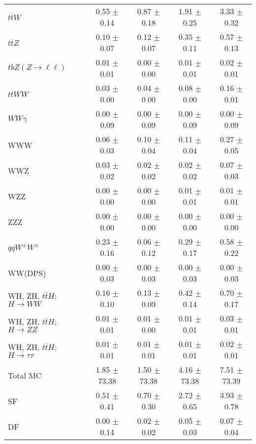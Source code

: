 \begin{tabular}{l|cccc}
                   $t\overline{t}W$ &  0.55 $\pm$  0.14 &  0.87 $\pm$  0.18 &  1.91 $\pm$  0.25 &  3.33 $\pm$  0.32 \\
                   $t\overline{t}Z$ &  0.10 $\pm$  0.07 &  0.12 $\pm$  0.07 &  0.35 $\pm$  0.11 &  0.57 $\pm$  0.13 \\
    $tbZ (Z \rightarrow \ell \ell)$ &  0.01 $\pm$  0.01 &  0.00 $\pm$  0.00 &  0.01 $\pm$  0.01 &  0.02 $\pm$  0.01 \\
                  $t\overline{t}WW$ &  0.03 $\pm$  0.00 &  0.04 $\pm$  0.00 &  0.08 $\pm$  0.00 &  0.16 $\pm$  0.01 \\
                         $WW\gamma$ &  0.00 $\pm$  0.09 &  0.00 $\pm$  0.09 &  0.00 $\pm$  0.09 &  0.00 $\pm$  0.09 \\
                                WWW &  0.06 $\pm$  0.03 &  0.10 $\pm$  0.04 &  0.11 $\pm$  0.04 &  0.27 $\pm$  0.05 \\
                                WWZ &  0.03 $\pm$  0.02 &  0.02 $\pm$  0.02 &  0.02 $\pm$  0.02 &  0.07 $\pm$  0.03 \\
                                WZZ &  0.00 $\pm$  0.00 &  0.00 $\pm$  0.00 &  0.01 $\pm$  0.01 &  0.01 $\pm$  0.01 \\
                                ZZZ &  0.00 $\pm$  0.00 &  0.00 $\pm$  0.00 &  0.00 $\pm$  0.00 &  0.00 $\pm$  0.00 \\
                 $qqW^{\pm}W^{\pm}$ &  0.23 $\pm$  0.16 &  0.06 $\pm$  0.12 &  0.29 $\pm$  0.17 &  0.58 $\pm$  0.22 \\
                            WW(DPS) &  0.00 $\pm$  0.03 &  0.00 $\pm$  0.03 &  0.00 $\pm$  0.03 &  0.00 $\pm$  0.03 \\
WH, ZH, $t\bar{t}H$; $H \rightarrow WW$ &  0.16 $\pm$  0.10 &  0.13 $\pm$  0.09 &  0.42 $\pm$  0.14 &  0.70 $\pm$  0.17 \\
WH, ZH, $t\bar{t}H$; $H \rightarrow ZZ$ &  0.01 $\pm$  0.01 &  0.01 $\pm$  0.00 &  0.01 $\pm$  0.01 &  0.03 $\pm$  0.01 \\
WH, ZH, $t\bar{t}H$; $H \rightarrow \tau\tau$ &  0.01 $\pm$  0.01 &  0.01 $\pm$  0.01 &  0.01 $\pm$  0.01 &  0.02 $\pm$  0.01 \\
\hline\hline
                           Total MC &  1.85 $\pm$ 73.38 &  1.50 $\pm$ 73.38 &  4.16 $\pm$ 73.38 &  7.51 $\pm$ 73.39 \\
\hline
                                 SF &  0.51 $\pm$  0.41 &  0.70 $\pm$  0.30 &  2.72 $\pm$  0.65 &  3.93 $\pm$  0.78 \\
                                 DF &  0.00 $\pm$  0.14 &  0.02 $\pm$  0.02 &  0.05 $\pm$  0.03 &  0.07 $\pm$  0.04 \\

\end{tabular}
